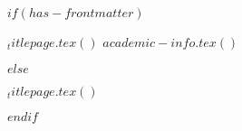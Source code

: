 $if(has-frontmatter)$
  \begin{frontmatter}
  \begin{titlepage}
  $_titlepage.tex()$
  $academic-info.tex()$
  
  \end{titlepage}
  \end{frontmatter}
$else$
  \begin{titlepage}
  $_titlepage.tex()$
  
  \end{titlepage}
$endif$

  
